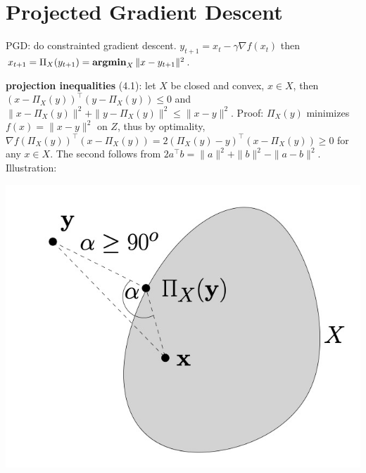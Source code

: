 \section{Projected Gradient Descent}

PGD: do constrainted gradient descent. $y_{t+1} = x_t - \gamma \nabla f(x_t)$ then $x_{t+1} = \Pi_X(y_{t+1}) = \operatorname{\textbf{argmin}}_{X} \|x - y_{t+1}\|^2$.

\textbf{projection inequalities} (4.1): let $X$ be closed and convex, $x\in X$, then $(x - \Pi_X(y))^\top (y - \Pi_X(y)) \le 0$ and $\|x - \Pi_X(y)\|^2 + \|y - \Pi_X(y)\|^2 \le \|x - y\|^2$. Proof: $\Pi_X(y)$ minimizes $f(x) = \|x- y\|^2$ on $Z$, thus by optimality, $\nabla f(\Pi_X(y))^\top (x - \Pi_X(y)) = 2(\Pi_X(y) - y)^\top (x - \Pi_X(y)) \ge 0$ for any $x \in X$. The second follows from $2a^\top b = \|a\|^2 + \|b\|^2 - \|a - b\|^2$. Illustration:
    \begin{center}
        \includegraphics[width=.6\linewidth]{imgs/projection.jpg}
    \end{center}


